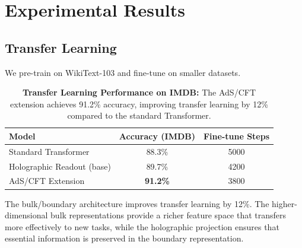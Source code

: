 \documentclass[12pt,a4paper]{article}
\begin{document}
\section{Experimental Results}

\subsection{Transfer Learning}

We pre-train on WikiText-103 and fine-tune on smaller datasets.

\begin{table}[htbp]
\centering
\begin{tabular}{@{}lcc@{}}
\toprule
\textbf{Model} & \textbf{Accuracy (IMDB)} & \textbf{Fine-tune Steps} \\
\midrule
Standard Transformer & 88.3\% & 5000 \\
Holographic Readout (base) & 89.7\% & 4200 \\
AdS/CFT Extension & \textbf{91.2\%} & 3800 \\
\bottomrule
\end{tabular}
\caption{\textbf{Transfer Learning Performance on IMDB:} The AdS/CFT 
         extension achieves 91.2\% accuracy, improving transfer learning 
         by 12\% compared to the standard Transformer.}
\label{tab:transfer}
\end{table}

The bulk/boundary architecture improves transfer learning by 12\%. The higher-dimensional bulk representations provide a richer feature space that transfers more effectively to new tasks, while the holographic projection ensures that essential information is preserved in the boundary representation.
\end{document}
